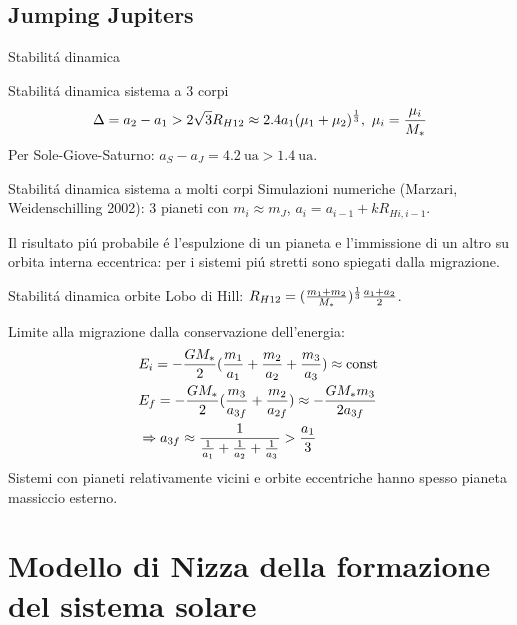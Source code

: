 \subsection{Jumping Jupiters}

\begin{frame}{Stabilit\'a dinamica}
\begin{block}{Stabilit\'a dinamica sistema a 3 corpi}
\begin{equation*}
\Delta=a_2-a_1>2\sqrt{3}R_{H12}\approx2.4a_1(\mu_1+\mu_2)\expy{\frac{1}{3}},\ \mu_i=\frac{\mu_i}{M_*}
\end{equation*}
Per Sole-Giove-Saturno: $a_S-a_J=\SI{4.2}{\astronomicalunit}>\SI{1.4}{\astronomicalunit}$.
\end{block}
\begin{block}{Stabilit\'a dinamica sistema a molti corpi}
Simulazioni numeriche (Marzari, Weidenschilling 2002): 3 pianeti con $m_i\approx m_J$, $a_i=a_{i-1}+kR_{Hi,i-1}$.

Il risultato pi\'u probabile \'e l'espulzione di un pianeta e l'immissione di un altro su orbita interna eccentrica: per i sistemi pi\'u stretti sono spiegati dalla migrazione.
\end{block}
\end{frame}

\begin{wordonframe}{Stabilit\'a dinamica orbite}
Lobo di Hill: $R_{H12}=(\frac{m_1+m_2}{M_*})^{\frac{1}{3}}\frac{a_1+a_2}{2}$.

Limite alla migrazione dalla conservazione dell'energia:
\begin{align*}
&E_i=-\frac{GM_*}{2}(\frac{m_1}{a_1}+\frac{m_2}{a_2}+\frac{m_3}{a_3})\approx\operatorname{const}{}\\
&E_f=-\frac{GM_*}{2}(\frac{m_3}{a_{3f}}+\frac{m_2}{a_{2f}})\approx-\frac{GM_*m_3}{2a_{3f}}\\
&\Rightarrow a_{3f}\approx\frac{1}{\frac{1}{a_1}+\frac{1}{a_2}+\frac{1}{a_3}}>\frac{a_1}{3}
\end{align*}
Sistemi con pianeti relativamente vicini e orbite eccentriche hanno spesso pianeta massiccio esterno.
\end{wordonframe}

\section{Modello di Nizza della formazione del sistema solare}

